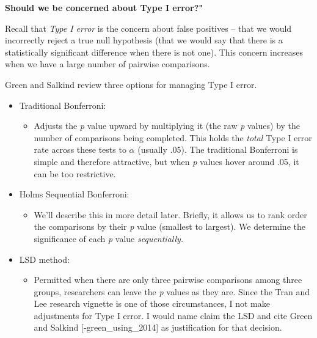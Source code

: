 \documentclass[
  english,
]{book}
\providecommand{\tightlist}{%
  \setlength{\itemsep}{0pt}\setlength{\parskip}{0pt}}
\begin{document}
\textbf{Should we be concerned about Type I error?"}

Recall that \emph{Type I error} is the concern about false positives -- that we would incorrectly reject a true null hypothesis (that we would say that there is a statistically significant difference when there is not one). This concern increases when we have a large number of pairwise comparisons.

Green and Salkind \citeyearpar{green_using_2014} review three options for managing Type I error.

\begin{itemize}
\tightlist
\item
  Traditional Bonferroni:

  \begin{itemize}
  \tightlist
  \item
    Adjusts the \emph{p} value upward by multiplying it (the raw \emph{p} values) by the number of comparisons being completed. This holds the \emph{total} Type I error rate across these tests to \(\alpha\) (usually .05). The traditional Bonferroni is simple and therefore attractive, but when \emph{p} values hover around .05, it can be too restrictive.
  \end{itemize}
\item
  Holms Sequential Bonferroni:

  \begin{itemize}
  \tightlist
  \item
    We'll describe this in more detail later. Briefly, it allows us to rank order the comparisons by their \emph{p} value (smallest to largest). We determine the significance of each \emph{p} value \emph{sequentially.}\\
  \end{itemize}
\item
  LSD method:

  \begin{itemize}
  \tightlist
  \item
    Permitted when there are only three pairwise comparisons among three groups, researchers can leave the \emph{p} values as they are. Since the Tran and Lee \citeyearpar{tran_you_2014} research vignette is one of those circumstances, I not make adjustments for Type I error. I would name claim the LSD and cite Green and Salkind {[}-green\_using\_2014{]} as justification for that decision.
  \end{itemize}
\end{itemize}
\end{document}
